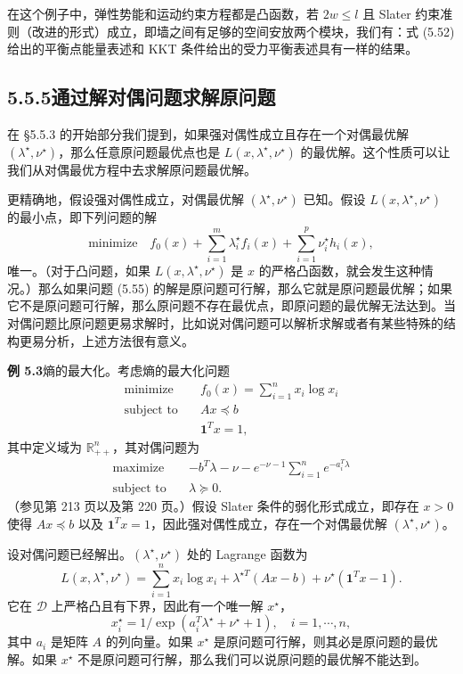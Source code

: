 \documentclass[UTF8,12pt,a4paper,fontset=fandol]{ctexart}
\begin{document}
在这个例子中，弹性势能和运动约束方程都是凸函数，若 $2w\leq l$ 且 Slater 约束准则（改进的形式）成立，即墙之间有足够的空间安放两个模块，我们有：式 (5.52) 给出的平衡点能量表述和 KKT 条件给出的受力平衡表述具有一样的结果。

\subsection*{5.5.5\quad 通过解对偶问题求解原问题}

在 \S 5.5.3 的开始部分我们提到，如果强对偶性成立且存在一个对偶最优解 $(\lambda^\star,\nu^\star)$，那么任意原问题最优点也是 $L(x,\lambda^\star,\nu^\star)$ 的最优解。这个性质可以让我们从对偶最优方程中去求解原问题最优解。

更精确地，假设强对偶性成立，对偶最优解 $(\lambda^\star,\nu^\star)$ 已知。假设 $L(x,\lambda^\star,\nu^\star)$ 的最小点，即下列问题的解
\[
\text{minimize}\quad f_0(x)+\sum_{i=1}^m\lambda_i^\star f_i(x)+\sum_{i=1}^p\nu_i^\star h_i(x),
\tag{5.55}
\]
唯一。（对于凸问题，如果 $L(x,\lambda^\star,\nu^\star)$ 是 $x$ 的严格凸函数，就会发生这种情况。）那么如果问题 (5.55) 的解是原问题可行解，那么它就是原问题最优解；如果它不是原问题可行解，那么原问题不存在最优点，即原问题的最优解无法达到。当对偶问题比原问题更易求解时，比如说对偶问题可以解析求解或者有某些特殊的结构更易分析，上述方法很有意义。

\noindent\textbf{例 5.3}\quad 熵的最大化。考虑熵的最大化问题
\[
\begin{aligned}
\text{minimize}\quad & f_0(x)=\sum_{i=1}^n x_i\log x_i\\
\text{subject to}\quad & Ax\preceq b\\
& \mathbf{1}^Tx=1,
\end{aligned}
\]
其中定义域为 $\mathbb{R}_{++}^n$，其对偶问题为
\[
\begin{aligned}
\text{maximize}\quad & -b^T\lambda-\nu-e^{-\nu-1}\sum_{i=1}^n e^{-a_i^T\lambda}\\
\text{subject to}\quad & \lambda\succeq 0.
\end{aligned}
\]
（参见第 213 页以及第 220 页。）假设 Slater 条件的弱化形式成立，即存在 $x>0$ 使得 $Ax\preceq b$ 以及 $\mathbf{1}^Tx=1$，因此强对偶性成立，存在一个对偶最优解 $(\lambda^\star,\nu^\star)$。

设对偶问题已经解出。$(\lambda^\star,\nu^\star)$ 处的 Lagrange 函数为
\[
L(x,\lambda^\star,\nu^\star)=\sum_{i=1}^n x_i\log x_i+\lambda^{\star T}(Ax-b)+\nu^\star(\mathbf{1}^Tx-1).
\]
它在 $\mathcal{D}$ 上严格凸且有下界，因此有一个唯一解 $x^\star$，
\[
x_i^\star=1/\exp(a_i^T\lambda^\star+\nu^\star+1),\quad i=1,\cdots,n,
\]
其中 $a_i$ 是矩阵 $A$ 的列向量。如果 $x^\star$ 是原问题可行解，则其必是原问题的最优解。如果 $x^\star$ 不是原问题可行解，那么我们可以说原问题的最优解不能达到。
\end{document}
